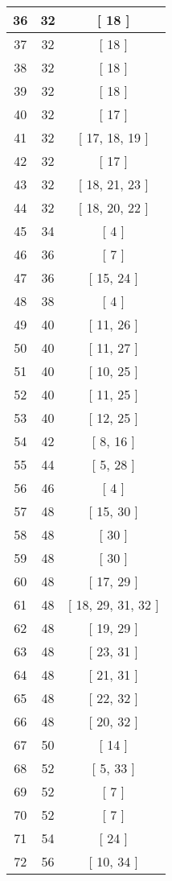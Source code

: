 \begin{center}
\begin{longtable}[H]{|| c c c ||}
36 & 32 & [ 18 ] \\ 
\hline
37 & 32 & [ 18 ] \\ 
\hline
38 & 32 & [ 18 ] \\ 
\hline
39 & 32 & [ 18 ] \\ 
\hline
40 & 32 & [ 17 ] \\ 
\hline
41 & 32 & [ 17, 18, 19 ] \\ 
\hline
42 & 32 & [ 17 ] \\ 
\hline
43 & 32 & [ 18, 21, 23 ] \\ 
\hline
44 & 32 & [ 18, 20, 22 ] \\ 
\hline
45 & 34 & [ 4 ] \\ 
\hline
46 & 36 & [ 7 ] \\ 
\hline
47 & 36 & [ 15, 24 ] \\ 
\hline
48 & 38 & [ 4 ] \\ 
\hline
49 & 40 & [ 11, 26 ] \\ 
\hline
50 & 40 & [ 11, 27 ] \\ 
\hline
51 & 40 & [ 10, 25 ] \\ 
\hline
52 & 40 & [ 11, 25 ] \\ 
\hline
53 & 40 & [ 12, 25 ] \\ 
\hline
54 & 42 & [ 8, 16 ] \\ 
\hline
55 & 44 & [ 5, 28 ] \\ 
\hline
56 & 46 & [ 4 ] \\ 
\hline
57 & 48 & [ 15, 30 ] \\ 
\hline
58 & 48 & [ 30 ] \\ 
\hline
59 & 48 & [ 30 ] \\ 
\hline
60 & 48 & [ 17, 29 ] \\ 
\hline
61 & 48 & [ 18, 29, 31, 32 ] \\ 
\hline
62 & 48 & [ 19, 29 ] \\ 
\hline
63 & 48 & [ 23, 31 ] \\ 
\hline
64 & 48 & [ 21, 31 ] \\ 
\hline
65 & 48 & [ 22, 32 ] \\ 
\hline
66 & 48 & [ 20, 32 ] \\ 
\hline
67 & 50 & [ 14 ] \\ 
\hline
68 & 52 & [ 5, 33 ] \\ 
\hline
69 & 52 & [ 7 ] \\ 
\hline
70 & 52 & [ 7 ] \\ 
\hline
71 & 54 & [ 24 ] \\ 
\hline
72 & 56 & [ 10, 34 ] \\ 

\end{longtable}
\end{center}
